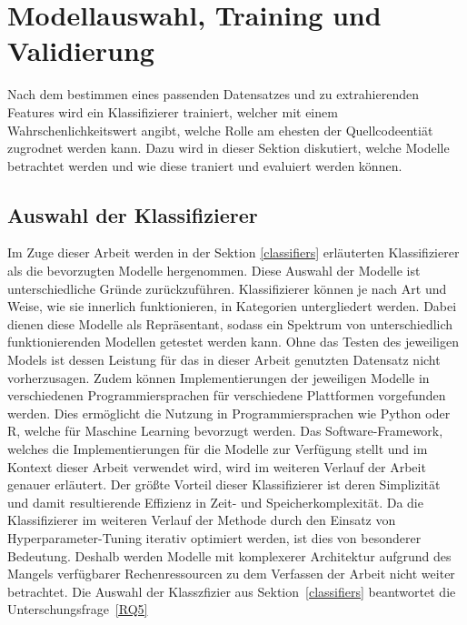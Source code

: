 \section{Modellauswahl, Training und Validierung}
Nach dem bestimmen eines passenden Datensatzes und zu extrahierenden Features wird ein Klassifizierer trainiert, welcher mit einem Wahrschenlichkeitswert angibt, welche Rolle am ehesten der Quellcodeentiät zugrodnet werden kann.
Dazu wird in dieser Sektion diskutiert, welche Modelle betrachtet werden und wie diese traniert und evaluiert werden können. 


\subsection*{Auswahl der Klassifizierer}
Im Zuge dieser Arbeit werden in der Sektion \ref{classifiers} erläuterten Klassifizierer als die bevorzugten Modelle hergenommen. Diese Auswahl der Modelle ist unterschiedliche Gründe zurückzuführen.
Klassifizierer können je nach Art und Weise, wie sie innerlich funktionieren, in Kategorien untergliedert werden. Dabei dienen diese Modelle als Repräsentant, sodass ein Spektrum von unterschiedlich funktionierenden Modellen getestet werden kann.
Ohne das Testen des jeweiligen Models ist dessen Leistung für das in dieser Arbeit genutzten Datensatz nicht vorherzusagen. Zudem können Implementierungen der jeweiligen Modelle in verschiedenen Programmiersprachen für verschiedene Plattformen vorgefunden werden.
Dies ermöglicht die Nutzung in Programmiersprachen wie Python oder R, welche für Maschine Learning bevorzugt werden. Das Software-Framework, welches die Implementierungen für die Modelle zur Verfügung stellt und im Kontext dieser Arbeit verwendet wird, wird im weiteren Verlauf der Arbeit genauer erläutert.
Der größte Vorteil dieser Klassifizierer ist deren Simplizität und damit resultierende Effizienz in Zeit- und Speicherkomplexität. Da die Klassifizierer im weiteren Verlauf der Methode durch den Einsatz von Hyperparameter-Tuning iterativ optimiert werden, ist dies von besonderer Bedeutung.
Deshalb werden Modelle mit komplexerer Architektur aufgrund des Mangels verfügbarer Rechenressourcen zu dem Verfassen der Arbeit nicht weiter betrachtet. 
Die Auswahl der Klasszfizier aus Sektion~\ref{classifiers} beantwortet die Unterschungsfrage~\ref{RQ5}



